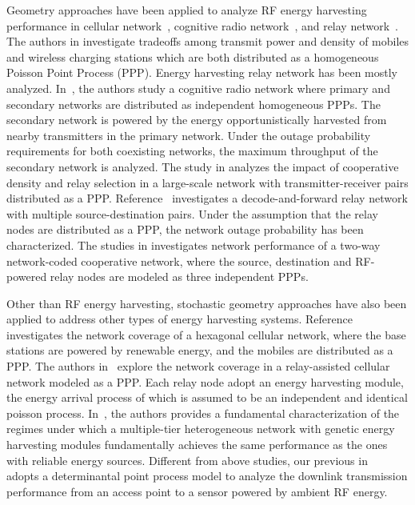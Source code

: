 \documentclass[12pt,draftclsnofoot,onecolumn]{IEEEtran}
\begin{document}
Geometry approaches have been applied to analyze RF energy harvesting performance in cellular network~\cite{K2014Huang}, cognitive radio network~\cite{S2013Lee}, and relay network~\cite{I2014Krikidis,Z.2014Ding,V.2014Mekikis}. The authors in \cite{K2014Huang} investigate tradeoffs among transmit power and density of mobiles and wireless charging stations which are both distributed as a homogeneous Poisson Point Process (PPP). Energy harvesting relay network has been mostly analyzed. In~\cite{S2013Lee}, the authors study a cognitive radio network where primary and secondary networks are distributed as independent homogeneous PPPs. The secondary network is powered by the energy opportunistically harvested from nearby transmitters in the primary network. Under the outage probability requirements for both coexisting networks, the maximum throughput of the secondary network is analyzed. The study in \cite{I2014Krikidis} analyzes the impact of cooperative density and relay selection in a large-scale network with transmitter-receiver pairs distributed as a PPP. 
Reference~\cite{Z.2014Ding} investigates a decode-and-forward relay network with multiple source-destination pairs. Under the assumption that the relay nodes are distributed as a PPP, the network outage probability has been characterized. 
The studies in \cite{V.2014Mekikis} investigates network performance of a two-way network-coded cooperative network, where the source, destination and RF-powered relay nodes are modeled as three independent PPPs. 





Other than RF energy harvesting, stochastic geometry approaches have also been applied to address other types of energy harvesting systems. 
Reference~\cite{K.2014Huang} investigates the network coverage of a hexagonal cellular network, where the base stations are powered by renewable energy, and the mobiles are distributed as a PPP. The authors in~\cite{Y.2014Song} explore the network coverage in a relay-assisted cellular network modeled as a PPP. Each relay node adopt an energy harvesting module, the energy arrival process of which is assumed to be an independent and identical poisson process.                       
In~\cite{S.2014Dhillon}, the authors provides a fundamental characterization of the regimes under which a multiple-tier heterogeneous network with genetic energy harvesting modules  fundamentally achieves the same performance as the ones with reliable energy sources.  Different from above studies, our previous in~\cite{X.LuWCNC} adopts  a determinantal point process model to analyze the downlink transmission performance from an access point to a sensor powered by ambient RF energy.  
\end{document}
